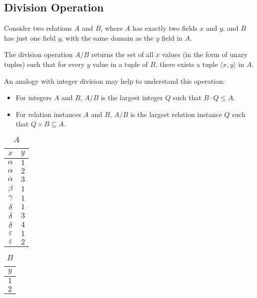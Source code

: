 \subsection{Division Operation}
\begin{minipage}{0.65\textwidth}
  Consider two relations \(A\) and \(B\), where \(A\) has exactly two fields \(x\) and \(y\), and \(B\) has just one field \(y\), with the same domain as the \(y\) field in \(A\).

  The division operation \(A / B\) returns the set of all \(x\) values (in the form of unary tuples) such that for every \(y\) value in a tuple of \(B\), there exists a tuple \(\langle x, y \rangle\) in \(A\).
  
  An analogy with integer division may help to understand this operation:
  \begin{itemize}
    \item For integers \(A\) and \(B\), \(A / B\) is the largest integer \(Q\) such that \(B \cdot Q \leq A\).
    \item For relation instances \(A\) and \(B\), \(A / B\) is the largest relation instance \(Q\) such that \(Q \times B \subseteq A\).
  \end{itemize}
\end{minipage}\quad
\begin{minipage}{0.1\textwidth}
  \begin{table}[H]
  \centering
  \begin{tabular}{c|c}
      \toprule
      \(x\) & \(y\)  \\
    \midrule
      \(\alpha\) & \(1\)  \\
      \(\alpha\) & \(2\)  \\
      \(\alpha\) & \(3\)  \\
      \(\beta\) & \(1\)  \\
      \(\gamma\) & \(1\)  \\
      \(\delta\) & \(1\)  \\
      \(\delta\) & \(3\)  \\
      \(\delta\) & \(4\)  \\
      \(\varepsilon\) & \(1\)  \\
      \(\varepsilon\) & \(2\)  \\
      \bottomrule
  \end{tabular}
  \caption*{\(A\)}
\end{table}
\end{minipage}
\begin{minipage}{0.1\textwidth}
  \begin{table}[H]
  \centering
  \begin{tabular}{c}
      \toprule
      \(y\)  \\
    \midrule
      \(1\)  \\
      \(2\)  \\
      \bottomrule
  \end{tabular}
  \caption*{\(B\)}
\end{table}
\end{minipage}
